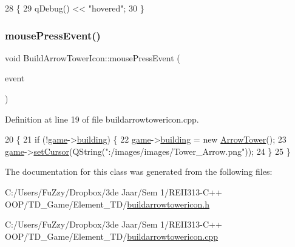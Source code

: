 \begin{DoxyCode}
28 \{
29     qDebug() << \textcolor{stringliteral}{"hovered"};
30 \}
\end{DoxyCode}
\mbox{\label{class_build_arrow_tower_icon_ac2c2f51dd778437f191345b06751a785}} 
\subsubsection{\texorpdfstring{mouse\+Press\+Event()}{mousePressEvent()}}
{\footnotesize\ttfamily void Build\+Arrow\+Tower\+Icon\+::mouse\+Press\+Event (\begin{DoxyParamCaption}\item[{Q\+Graphics\+Scene\+Mouse\+Event $\ast$}]{event }\end{DoxyParamCaption})}



Definition at line 19 of file buildarrowtowericon.\+cpp.


\begin{DoxyCode}
20 \{
21     \textcolor{keywordflow}{if} (!\hyperlink{buildarrowtowericon_8cpp_a58bdb5643d0814ac4e697a1564b79b70}{game}->\hyperlink{class_game_a5917b4e021a93be7666ebc2ef4529401}{building}) \{
22         \hyperlink{buildarrowtowericon_8cpp_a58bdb5643d0814ac4e697a1564b79b70}{game}->\hyperlink{class_game_a5917b4e021a93be7666ebc2ef4529401}{building} = \textcolor{keyword}{new} \hyperlink{class_arrow_tower}{ArrowTower}();
23         \hyperlink{buildarrowtowericon_8cpp_a58bdb5643d0814ac4e697a1564b79b70}{game}->\hyperlink{class_game_a7272e282812b8af0be83044db196dc6c}{setCursor}(QString(\textcolor{stringliteral}{":/images/images/Tower\_Arrow.png"}));
24     \}
25 \}
\end{DoxyCode}


The documentation for this class was generated from the following files\+:\begin{DoxyCompactItemize}
\item 
C\+:/\+Users/\+Fu\+Zzy/\+Dropbox/3de Jaar/\+Sem 1/\+R\+E\+I\+I313-\/\+C++ O\+O\+P/\+T\+D\+\_\+\+Game/\+Element\+\_\+\+T\+D/\hyperlink{buildarrowtowericon_8h}{buildarrowtowericon.\+h}\item 
C\+:/\+Users/\+Fu\+Zzy/\+Dropbox/3de Jaar/\+Sem 1/\+R\+E\+I\+I313-\/\+C++ O\+O\+P/\+T\+D\+\_\+\+Game/\+Element\+\_\+\+T\+D/\hyperlink{buildarrowtowericon_8cpp}{buildarrowtowericon.\+cpp}\end{DoxyCompactItemize}
